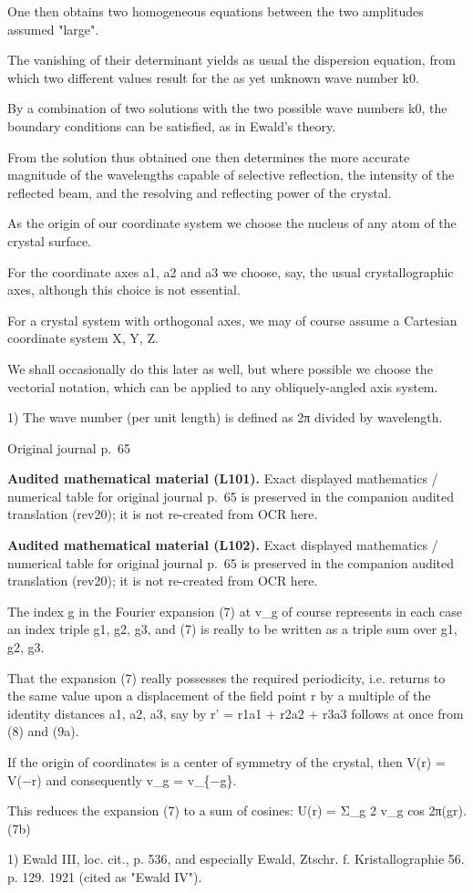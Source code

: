 \documentclass[10pt]{article}
\newcommand{\origpage}[1]{\par\medskip\noindent\hfill{\small\color{notegray}Original journal p.~#1}\hfill\mbox{}\par\smallskip}
\newcommand{\mathref}[2]{\par\smallskip\noindent\colorbox{gray!8}{\parbox{0.95\linewidth}{\small\color{notegray}\textbf{Audited mathematical material (L#1).} Exact displayed mathematics / numerical table for original journal p.~#2 is preserved in the companion audited translation (rev20); it is not re-created from OCR here.}}\par\smallskip}
\begin{document}
One then obtains two homogeneous equations between the two amplitudes assumed "large".\par
The vanishing of their determinant yields as usual the dispersion equation, from which two different values result for the as yet unknown wave number k0.\par
By a combination of two solutions with the two possible wave numbers k0, the boundary conditions can be satisfied, as in Ewald's theory.\par
From the solution thus obtained one then determines the more accurate magnitude of the wavelengths capable of selective reflection, the intensity of the reflected beam, and the resolving and reflecting power of the crystal.\par
As the origin of our coordinate system we choose the nucleus of any atom of the crystal surface.\par
For the coordinate axes a1, a2 and a3 we choose, say, the usual crystallographic axes, although this choice is not essential.\par
For a crystal system with orthogonal axes, we may of course assume a Cartesian coordinate system X, Y, Z.\par
We shall occasionally do this later as well, but where possible we choose the vectorial notation, which can be applied to any obliquely-angled axis system.\par
\noindent\footnotesize 1) The wave number (per unit length) is defined as 2π divided by wavelength.\par\normalsize
\origpage{65}
\mathref{101}{65}
\mathref{102}{65}
The index g in the Fourier expansion (7) at v\_g of course represents in each case an index triple g1, g2, g3, and (7) is really to be written as a triple sum over g1, g2, g3.\par
That the expansion (7) really possesses the required periodicity, i.e. returns to the same value upon a displacement of the field point r by a multiple of the identity distances a1, a2, a3, say by r' = r1a1 + r2a2 + r3a3 follows at once from (8) and (9a).\par
If the origin of coordinates is a center of symmetry of the crystal, then V(r) = V(−r) and consequently v\_g = v\_\{−g\}.\par
This reduces the expansion (7) to a sum of cosines: U(r) = Σ\_g 2 v\_g cos 2π(gr). (7b)\par
\noindent\footnotesize 1) Ewald III, loc. cit., p. 536, and especially Ewald, Ztschr. f. Kristallographie 56. p. 129. 1921 (cited as "Ewald IV").\par\normalsize
\end{document}
